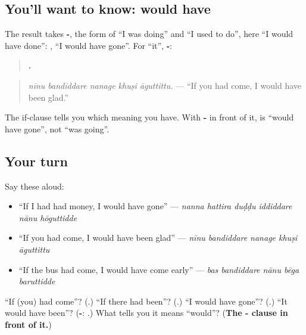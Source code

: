 \subsection*{You'll want to know: would have}
The result takes \textbf{-}, the form of \textquotedblleft{}I was doing\textquotedblright{} and \textquotedblleft{}I used to do\textquotedblright{}, here \textquotedblleft{}I would have done\textquotedblright{}: \textbf{}, \textquotedblleft{}I would have gone\textquotedblright{}. For \textquotedblleft{}it\textquotedblright{}, \textbf{-}:

\begin{quote}
\textbf{    .}
\end{quote}

\begin{quote}
\emph{nīnu bandiddare nanage khuṣi āguttittu.} — \textquotedblleft{}If you had come, I would have been glad.\textquotedblright{}
\end{quote}

The if-clause tells you which meaning you have. With \textbf{-} in front of it, \textbf{} is \textquotedblleft{}would have gone\textquotedblright{}, not \textquotedblleft{}was going\textquotedblright{}.

\subsection*{Your turn}
Say these aloud:

\begin{itemize}
\raggedright
  \item \textquotedblleft{}If I had had money, I would have gone\textquotedblright{} — \emph{nanna hattira duḍḍu iddiddare nānu hōguttidde}
  \item \textquotedblleft{}If you had come, I would have been glad\textquotedblright{} — \emph{nīnu bandiddare nanage khuṣi āguttittu}
  \item \textquotedblleft{}If the bus had come, I would have come early\textquotedblright{} — \emph{bas bandiddare nānu bēga baruttidde}
\end{itemize}

\begin{tcolorbox}[breakable,colback=teal!4,colframe=teal!35!black,title={Before you move on}]
\textquotedblleft{}If (you) had come\textquotedblright{}? (\textbf{}.) \textquotedblleft{}If there had been\textquotedblright{}? (\textbf{}.) \textquotedblleft{}I would have gone\textquotedblright{}? (\textbf{}.) \textquotedblleft{}It would have been\textquotedblright{}? (\textbf{-}: \textbf{}.) What tells you it means \textquotedblleft{}would\textquotedblright{}? (\textbf{The - clause in front of it.})
\end{tcolorbox}
